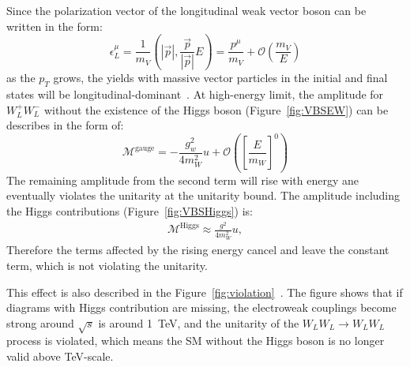 Since the polarization vector of the longitudinal weak vector boson can be written in the form: 
\begin{equation}
\epsilon_{L}^{\mu}=\frac{1}{m_{V}}\left(|\vec{p}|, \frac{\vec{p}}{|\vec{p}|} E\right)=\frac{p^{\mu}}{m_{V}}+\mathcal{O}\left(\frac{m_{V}}{E}\right)
\end{equation}
as the $p_{T}$ grows, the yields with massive vector particles in the initial and final states will be longitudinal-dominant~\cite{Rindani_2009}.
At high-energy limit, the amplitude for $W_L^+W_L^-$ without the existence of the Higgs boson (Figure~\ref{fig:VBSEW}) can be describes in the form of:
\begin{equation}
\mathcal{M}^{\text {gauge}}=-\frac{g_{w}^{2}}{4 m_{W}^{2}} u+\mathcal{O}\left(\left[\frac{E}{m_{W}}\right]^{0}\right)
\end{equation}
The remaining amplitude from the second term will rise with energy ane eventually violates the unitarity at the unitarity bound. 
The amplitude including the Higgs contributions (Figure~\ref{fig:VBSHiggs}) is:
\begin{equation}
\begin{aligned}
\mathcal{M}^{\text {Higgs}} 
\approx \frac{g^{2}}{4 m_{W}^{2}} u,
\end{aligned}
\end{equation}
Therefore the terms affected by the rising energy cancel and leave the constant term, which is not violating the unitarity.

This effect is also described in the Figure~\ref{fig:violation}~\cite{DENNER199827}.
The figure shows that if diagrams with Higgs contribution are missing, the electroweak couplings become strong around $\sqrt{s}$ is around 1~TeV, and the unitarity of the $W_LW_L \rightarrow W_LW_L$ process is violated, which means the SM without the Higgs boson is no longer valid above TeV-scale. 

